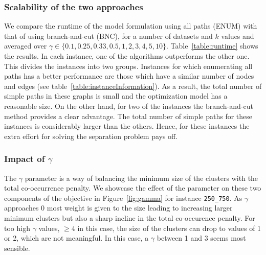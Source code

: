 \documentclass[conference]{IEEEtran}
\begin{document}
\subsubsection{Scalability of the two approaches}
We compare the runtime of the model formulation using all paths (ENUM) with that of using branch-and-cut (BNC), for a number of datasets and $k$ values and averaged over $\gamma\in\{0.1,0.25,0.33,0.5,1,2,3,4,5,10\}$. Table~\ref{table:runtime} shows the results. In each instance, one of the algorithms outperforms the other one. This divides the instances into two groups. Instances for which enumerating all paths has a better performance are those which have a similar number of nodes and edges (see table~\ref{table:instanceInformation}). As a result, the total number of simple paths in these graphs is small and the optimization model has a reasonable size. On the other hand, for two of the instances the branch-and-cut method provides a clear advantage. The total number of simple paths for these instances is considerably larger than the others. Hence, for these instances the extra effort for solving the separation problem pays off.

\subsubsection{Impact of $\gamma$}
The $\gamma$ parameter is a way of balancing the minimum size of the clusters with the total co-occurrence penalty. We showcase the effect of the parameter on these two components of the objective in Figure~\ref{fig:gamma} for instance \texttt{250\_750}. As $\gamma$ approaches $0$ most weight is given to the size leading to increasing larger minimum clusters but also a sharp incline in the total co-occurence penalty. For too high $\gamma$ values, $\geq 4$ in this case, the size of the clusters can drop to values of 1 or 2, which are not meaningful. In this case, a $\gamma$ between 1 and 3 seems most sensible.
\end{document}
